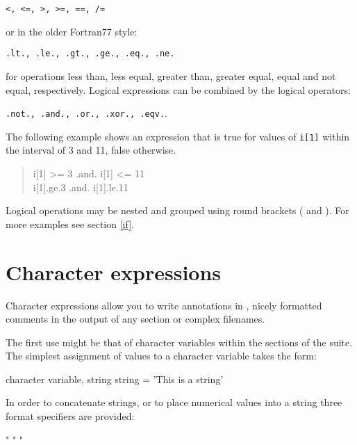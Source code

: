 {\tt <, <=, >, >=, ==, /=}

or in the older Fortran77 style:

{\tt .lt., .le., .gt., .ge., .eq., .ne.} 

for operations less than, less equal, greater than,
greater equal, equal and not equal, respectively. Logical
expressions can be combined by the logical operators:

 {\tt .not., .and., .or., .xor., .eqv.}.

The following example shows an
expression that is true for values of {\tt i[1]} within the interval
of 3 and 11, false otherwise.

\begin{quote}
  i[1] >= 3 .and. i[1] <= 11 \\
  i[1].ge.3 .and. i[1].le.11
\end{quote}

Logical operations may be nested and grouped using round
brackets ( and ). For more examples see section \ref{if}.


\section{Character expressions\label{char-exp}}

Character expressions allow you to write annotations in \kuplot, nicely 
formatted comments in the output of any section or complex filenames.

The first use might be that of character variables within the sections 
of the \Discus suite. The simplest assignment of values to a character 
variable takes the form:
\begin{MacVerbatim}
  character variable, string
  string = 'This is a string'
\end{MacVerbatim}

In order to concatenate strings, or to place numerical values into a 
string three format specifiers are provided:

\begin{MacVerbatim}
  "%
  "%
  "%
\end{MacVerbatim}

